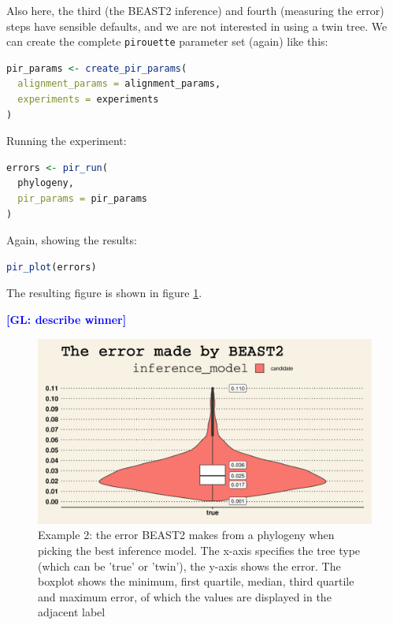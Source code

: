\documentclass{article}
\newcommand{\giovanni}[1]{\textcolor{blue}{\textbf{[GL: #1]}}}
\begin{document}
Also here, the third (the BEAST2 inference) and fourth (measuring the error)
steps have sensible defaults, and we are not
interested in using a twin tree. We can create the complete
\verb;pirouette; parameter set (again) like this:

\begin{lstlisting}[language=R, floatplacement=H, frame=single]
pir_params <- create_pir_params(
  alignment_params = alignment_params,
  experiments = experiments
)
\end{lstlisting}

Running the experiment:

\begin{lstlisting}[language=R, floatplacement=H, frame=single]
errors <- pir_run(
  phylogeny,
  pir_params = pir_params
)
\end{lstlisting}

Again, showing the results:

\begin{lstlisting}[language=R, floatplacement=H, frame=single]
pir_plot(errors)
\end{lstlisting}

The resulting figure is shown in figure \ref{fig:example_2}.

\giovanni{describe winner}

\begin{figure}[h]
  \includegraphics[width=\textwidth]{figure_example_2.png}
  \caption{
    Example 2: the error BEAST2 makes from a phylogeny when
    picking the best inference model.
    The x-axis specifies the tree type (which can be 'true' or 'twin'), the y-axis shows the error.
    The boxplot shows the minimum, first quartile, median, third 
    quartile and maximum error, of which the values are displayed 
    in the adjacent label
  }
  \label{fig:example_2}
\end{figure}
\end{document}
